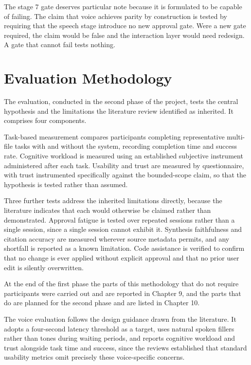 \documentclass{FastFyp}
\begin{document}
The stage 7 gate deserves particular note because it is formulated to be capable of failing. The claim that voice achieves parity by construction is tested by requiring that the speech stage introduce no new approval gate. Were a new gate required, the claim would be false and the interaction layer would need redesign. A gate that cannot fail tests nothing.

\section{Evaluation Methodology}
The evaluation, conducted in the second phase of the project, tests the central hypothesis and the limitations the literature review identified as inherited. It comprises four components.

Task-based measurement compares participants completing representative multi-file tasks with and without the system, recording completion time and success rate. Cognitive workload is measured using an established subjective instrument administered after each task. Usability and trust are measured by questionnaire, with trust instrumented specifically against the bounded-scope claim, so that the hypothesis is tested rather than assumed.

Three further tests address the inherited limitations directly, because the literature indicates that each would otherwise be claimed rather than demonstrated. Approval fatigue is tested over repeated sessions rather than a single session, since a single session cannot exhibit it. Synthesis faithfulness and citation accuracy are measured wherever source metadata permits, and any shortfall is reported as a known limitation. Code assistance is verified to confirm that no change is ever applied without explicit approval and that no prior user edit is silently overwritten.

At the end of the first phase the parts of this methodology that do not require participants were carried out and are reported in Chapter 9, and the parts that do are planned for the second phase and are listed in Chapter 10.

The voice evaluation follows the design guidance drawn from the literature. It adopts a four-second latency threshold as a target, uses natural spoken fillers rather than tones during waiting periods, and reports cognitive workload and trust alongside task time and success, since the reviews established that standard usability metrics omit precisely these voice-specific concerns.
\end{document}
